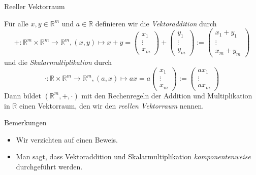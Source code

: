 \documentclass[
  8pt,
  ignorenonframetext,
]{beamer}
\providecommand{\tightlist}{%
  \setlength{\itemsep}{0pt}\setlength{\parskip}{0pt}}
\begin{document}
\begin{frame}{Reeller Vektorraum}
\protect\hypertarget{reeller-vektorraum-2}{}
\footnotesize
\begin{theorem}
\justifying
\normalfont
Für alle $x,y \in \mathbb{R}^m$ und $a \in \mathbb{R}$ definieren wir die \textit{Vektoraddition} durch
\begin{equation}
+ : \mathbb{R}^m \times \mathbb{R}^m \to \mathbb{R}^m, (x,y) \mapsto x + y =
\begin{pmatrix}
x_1 \\ \vdots \\ x_m
\end{pmatrix}
+
\begin{pmatrix}
y_1 \\ \vdots \\ y_m
\end{pmatrix}
:=
\begin{pmatrix}
x_1 + y_1 \\ \vdots \\ x_m + y_m
\end{pmatrix}
\end{equation}
und die \textit{Skalarmultiplikation} durch
\begin{equation}
\cdot : \mathbb{R} \times \mathbb{R}^m \to \mathbb{R}^m, (a,x) \mapsto
ax =
a
\begin{pmatrix}
x_1  \\ \vdots \\ x_m
\end{pmatrix}
:=
\begin{pmatrix}
ax_1  \\ \vdots \\a x_m
\end{pmatrix}
\end{equation}
Dann bildet $(\mathbb{R}^m,+,\cdot)$ mit den Rechenregeln der Addition und Multiplikation
in $\mathbb{R}$ einen Vektorraum, den wir den \textit{reellen Vektorraum} nennen.
\end{theorem}

Bemerkungen

\begin{itemize}
\tightlist
\item
  Wir verzichten auf einen Beweis.
\item
  Man sagt, dass Vektoraddition und Skalarmultiplikation
  \emph{komponentenweise} durchgeführt werden.
\end{itemize}
\end{frame}
\end{document}
